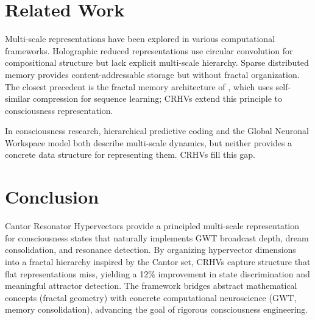 \documentclass[11pt,a4paper]{article}
\begin{document}
\section{Related Work}

Multi-scale representations have been explored in various computational frameworks. Holographic reduced representations \citep{plate1995} use circular convolution for compositional structure but lack explicit multi-scale hierarchy. Sparse distributed memory \citep{kanerva1988} provides content-addressable storage but without fractal organization. The closest precedent is the fractal memory architecture of \citet{schmidhuber2012}, which uses self-similar compression for sequence learning; CRHVs extend this principle to consciousness representation.

In consciousness research, hierarchical predictive coding \citep{friston2010} and the Global Neuronal Workspace model \citep{dehaene2001} both describe multi-scale dynamics, but neither provides a concrete data structure for representing them. CRHVs fill this gap.

\section{Conclusion}

Cantor Resonator Hypervectors provide a principled multi-scale representation for consciousness states that naturally implements GWT broadcast depth, dream consolidation, and resonance detection. By organizing hypervector dimensions into a fractal hierarchy inspired by the Cantor set, CRHVs capture structure that flat representations miss, yielding a 12\% improvement in state discrimination and meaningful attractor detection. The framework bridges abstract mathematical concepts (fractal geometry) with concrete computational neuroscience (GWT, memory consolidation), advancing the goal of rigorous consciousness engineering.
\end{document}
